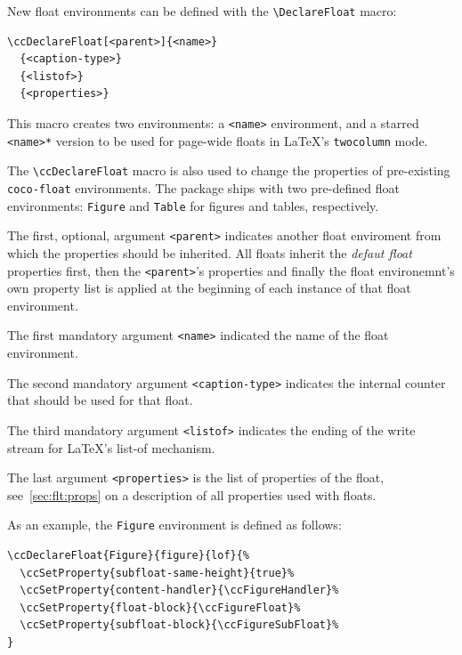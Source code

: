 New float environments can be defined with the
\lstinline{\DeclareFloat} macro:
\begin{lstlisting}[style=tex]
\ccDeclareFloat[<parent>]{<name>}
  {<caption-type>}
  {<listof>}
  {<properties>}
\end{lstlisting}
This macro creates two environments: a \lstinline{<name>} environment,
and a starred \lstinline{<name>*} version to be used for page-wide
floats in \LaTeX's \lstinline{twocolumn} mode.

The \lstinline{\ccDeclareFloat} macro is also used to change the
properties of pre-existing \lstinline{coco-float}
environments. The package ships with two pre-defined float
environments: \lstinline{Figure} and \lstinline{Table} for figures
and tables, respectively.

The first, optional, argument \lstinline{<parent>} indicates another
float enviroment from which the properties should be inherited. All
floats inherit the \textit{defaut float} properties first, then the
\lstinline{<parent>}'s properties and finally the float environemnt's
own property list is applied at the beginning of each instance of that
float environment.

The first mandatory argument \lstinline{<name>} indicated the name of the float
environment.

The second mandatory argument \lstinline{<caption-type>} indicates the
internal counter that should be used for that float.

The third mandatory argument \lstinline{<listof>} indicates the ending
of the write stream for \LaTeX's list-of mechanism.

The last argument \lstinline{<properties>} is the list of properties
of the float, see~\autoref{sec:flt:props} on a description of all
properties used with floats.

As an example, the \lstinline{Figure} environment is defined as
follows:
\begin{lstlisting}[style=tex]
\ccDeclareFloat{Figure}{figure}{lof}{%
  \ccSetProperty{subfloat-same-height}{true}%
  \ccSetProperty{content-handler}{\ccFigureHandler}%
  \ccSetProperty{float-block}{\ccFigureFloat}%
  \ccSetProperty{subfloat-block}{\ccFigureSubFloat}%
}
\end{lstlisting}



